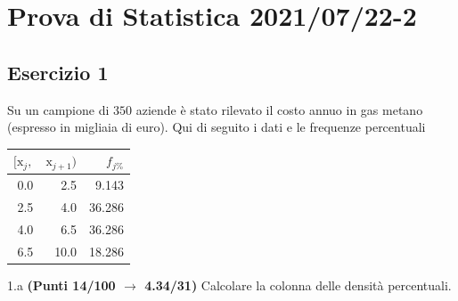 \documentclass[
  11pt,
]{book}
\theoremstyle{mytheoremstyle}
\theoremstyle{mydefstyle}
\begin{document}
\section{Prova di Statistica 2021/07/22-2}\label{prova-di-statistica-20210722-2}

\subsection{Esercizio 1}\label{esercizio-1-8}

Su un campione di \(350\) aziende è stato rilevato il costo annuo in gas metano (espresso in migliaia di euro). Qui di seguito i dati e le frequenze percentuali

\begin{table}[H]
\centering
\begin{tabular}{rrr}
\toprule
$[\text{x}_j,$ & $\text{x}_{j+1})$ & $f_{j\%}$\\
\midrule
0.0 & 2.5 & 9.143\\
2.5 & 4.0 & 36.286\\
4.0 & 6.5 & 36.286\\
6.5 & 10.0 & 18.286\\
\bottomrule
\end{tabular}
\end{table}

1.a \textbf{(Punti 14/100 \(\rightarrow\) 4.34/31)} Calcolare la colonna delle densità percentuali.
\end{document}
